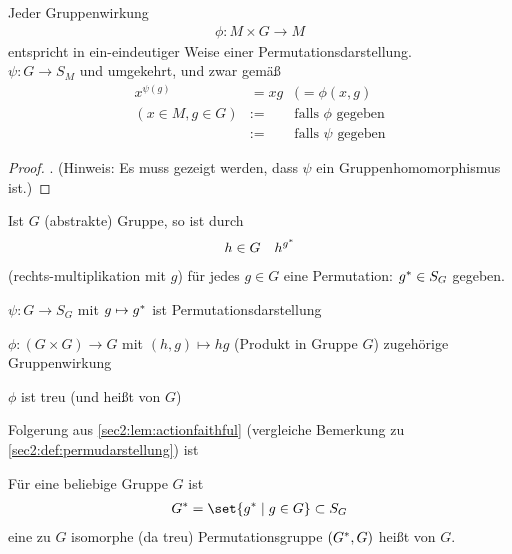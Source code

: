 \begin{proposition}\label{sec2:prop:groupaction}
	Jeder Gruppenwirkung
	\begin{align*}
		\phi\colon M\times G \to M
	\end{align*}
	entspricht in ein-eindeutiger Weise einer Permutationsdarstellung.\\
	$\psi\colon G \to S_M$ und umgekehrt, und zwar gemäß
	\begin{align*}
		x^{\psi(g)} &= xg & (= \phi(x,g)\\
		(x\in M, g\in G) &:= & \text{falls $\phi$ gegeben}\\
		& := &\text{falls $\psi$ gegeben}
	\end{align*}
\end{proposition}
\begin{proof}
	\sest. (Hinweis: Es muss gezeigt werden, dass $\psi$ ein Gruppenhomomorphismus ist.)
\end{proof}
\begin{lemma}
	\begin{lemmaenum}\label{sec2:lem:representation_permugroups}
		\item Ist $G$ (abstrakte) Gruppe, so ist durch
		\begin{align*}
			h \in G\quad h^{g^{\ast}}
		\end{align*}
		(rechts-multiplikation mit $g$) für jedes $g \in G$ eine Permutation: $g^{\ast}\in S_{G}$ gegeben.\label{sec2:lem:reppermu:rimu}
		\item $\psi\colon G \to S_G$ mit $g \mapsto g^{\ast}$ ist Permutationsdarstellung\label{sec:lem:reppermu:rep}
		\item $\phi\colon (G\times G) \to G$ mit $(h,g) \mapsto hg$ (Produkt in Gruppe $G$) zugehörige Gruppenwirkung\label{sec2:lem:reppermu:groupact}
		\item $\phi$ ist treu (und heißt  von $G$) \label{sec2:lem:actionfaithful}
	\end{lemmaenum}
\end{lemma}
Folgerung aus \cref{sec2:lem:actionfaithful} (vergleiche Bemerkung zu \cref{sec2:def:permudarstellung}) ist
\begin{conclusion}
	Für eine beliebige Gruppe $G$ ist
	\begin{align*}
		\st{G} = \set{\st{g} \mid g \in G} \subset S_G
	\end{align*}
	eine zu $G$ isomorphe (da treu) Permutationsgruppe $(G^{\ast},G)$ heißt  von $G$.
\end{conclusion}

